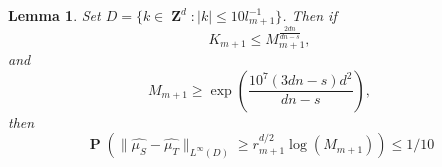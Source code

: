 \documentclass[12pt,reqno]{article}
\numberwithin{equation}{section}
\DeclareMathOperator{\ZZ}{\mathbf{Z}}
\newtheorem{lemma}[theorem]{Lemma}
\DeclareMathOperator{\PP}{\mathbf{P}}
\begin{document}
\begin{lemma} \label{deviationLemma}
    Set $D = \{ k \in \ZZ^d: |k| \leq 10l_{m+1}^{-1} \}$. Then if
    \begin{equation} \label{equation109519029012}
        K_{m+1} \leq M_{m+1}^{\frac{2dn}{dn - s}},
    \end{equation}
    and
    \begin{equation} \label{equation1940129041}
        M_{m+1} \geq \exp \left( \frac{10^7 (3dn - s) d^2}{dn - s} \right),
    \end{equation}
    then
    \begin{equation} \label{equation12901904192090129102}
        \PP \left( \| \widehat{\mu_S} - \widehat{\mu_T} \|_{L^\infty(D)} \geq r_{m+1}^{d/2} \log(M_{m+1}) \right) \leq 1/10
    \end{equation}
\end{lemma}
\end{document}
